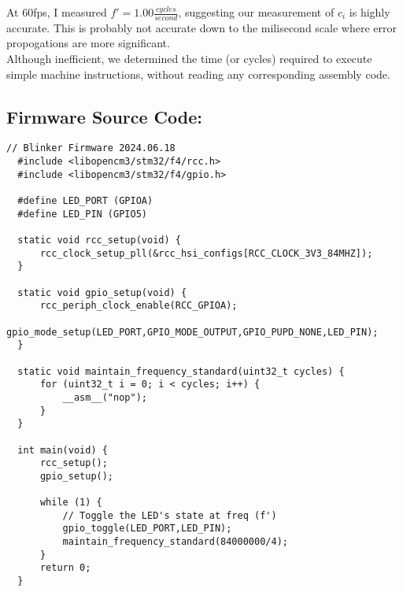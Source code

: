 \documentclass[a4paper,12pt]{article}   	%
\begin{document}
\begin{flushleft}
At 60fps, I measured $f' = 1.00 \frac{cycles}{second}$, suggesting our measurement of $c_i$ is highly accurate. 
This is probably not accurate down to the milisecond scale where error propogations are more significant.\\[2 ex]

Although inefficient, we determined the time (or cycles) required 
to execute simple machine instructions, without reading any corresponding assembly code.



\end{flushleft}

\subsection*{Firmware Source Code:}
\begin{lstlisting}[backgroundcolor = \color{beige}]
  // Blinker Firmware 2024.06.18
  #include <libopencm3/stm32/f4/rcc.h>
  #include <libopencm3/stm32/f4/gpio.h>
  
  #define LED_PORT (GPIOA)
  #define LED_PIN (GPIO5)
  
  static void rcc_setup(void) {
      rcc_clock_setup_pll(&rcc_hsi_configs[RCC_CLOCK_3V3_84MHZ]);
  }

  static void gpio_setup(void) {
      rcc_periph_clock_enable(RCC_GPIOA);
      gpio_mode_setup(LED_PORT,GPIO_MODE_OUTPUT,GPIO_PUPD_NONE,LED_PIN);
  }
  
  static void maintain_frequency_standard(uint32_t cycles) {
      for (uint32_t i = 0; i < cycles; i++) {
          __asm__("nop");
      }
  }
  
  int main(void) {
      rcc_setup();
      gpio_setup();
  
      while (1) {
          // Toggle the LED's state at freq (f')
          gpio_toggle(LED_PORT,LED_PIN);
          maintain_frequency_standard(84000000/4);
      }
      return 0;
  }


\end{lstlisting}
\end{document}
